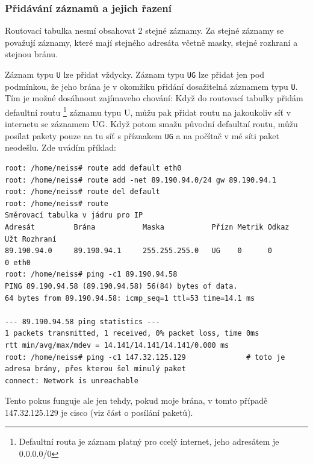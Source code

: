 \subsubsection{Přidávání záznamů a jejich řazení}

Routovací tabulka nesmí obsahovat 2 stejné záznamy. Za stejné záznamy se považují záznamy, které mají stejného adresáta včetně masky, stejné rozhraní a stejnou bránu.

Záznam typu \verb|U| lze přidat vždycky. Záznam typu \verb|UG| lze přidat jen pod podmínkou, že jeho brána je v okomžiku přidání dosažitelná záznamem typu \verb|U|. Tím je možné dosáhnout zajímaveho chování: Když do routovací tabulky přidám defaultní routu \footnote{Defaultní routa je záznam platný pro ccelý internet, jeho adresátem je 0.0.0.0/0} záznamu typu U, můžu pak přidat routu na jakoukoliv síť v internetu se záznamem UG. Když potom smažu původní defaultní routu, můžu posílat pakety pouze na tu síť s příznakem \verb|UG| a na počítač v mé síti paket neodešlu. Zde uvádím příklad:
\begin{verbatim}
root: /home/neiss# route add default eth0
root: /home/neiss# route add -net 89.190.94.0/24 gw 89.190.94.1
root: /home/neiss# route del default
root: /home/neiss# route
Směrovací tabulka v jádru pro IP
Adresát         Brána           Maska           Přízn Metrik Odkaz  Užt Rozhraní
89.190.94.0     89.190.94.1     255.255.255.0   UG    0      0        0 eth0
root: /home/neiss# ping -c1 89.190.94.58
PING 89.190.94.58 (89.190.94.58) 56(84) bytes of data.
64 bytes from 89.190.94.58: icmp_seq=1 ttl=53 time=14.1 ms

--- 89.190.94.58 ping statistics ---
1 packets transmitted, 1 received, 0% packet loss, time 0ms
rtt min/avg/max/mdev = 14.141/14.141/14.141/0.000 ms
root: /home/neiss# ping -c1 147.32.125.129				# toto je adresa brány, přes kterou šel minulý paket
connect: Network is unreachable
\end{verbatim}
Tento pokus funguje ale jen tehdy, pokud moje brána, v tomto případě 147.32.125.129 je cisco (viz část o posílání paketů).

